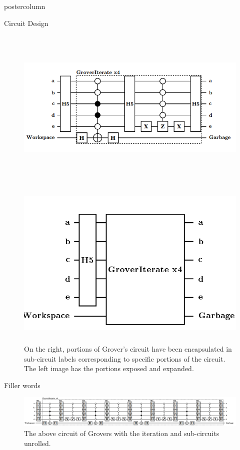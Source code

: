 \documentclass[final]{beamer} %
\begin{document}
\begin{frame}{}
\begin{columns}
\begin{column}{.33\textwidth}
\begin{beamercolorbox}[center,wd=\textwidth]{postercolumn}
\begin{minipage}[T]{.95\textwidth}
\begin{block}{\large Circuit Design}
             \centering 
		\begin{figure}[!htbp]
		  \centering
		  \includegraphics[height=3in]{figures/Grover_Loop.PNG} \ \ \ \ \includegraphics[height=3in]{figures/Grover_Roll.PNG} 
		  \caption{On the right, portions of Grover's circuit have been encapsulated in sub-circuit labels corresponding to specific portions of the circuit. The left image has the portions exposed and expanded.}
		\end{figure}

	    Filler words

             \centering 
		\begin{figure}[!htbp]
		  \centering
		  \includegraphics[width=14in]{figures/Grover_Unroll.PNG}
		  \caption{The above circuit of Grovers with the iteration and sub-circuits unrolled.}
		\end{figure}


\end{block}
\end{minipage}
\end{beamercolorbox}
\end{column}
\end{columns}
\end{frame}
\end{document}
